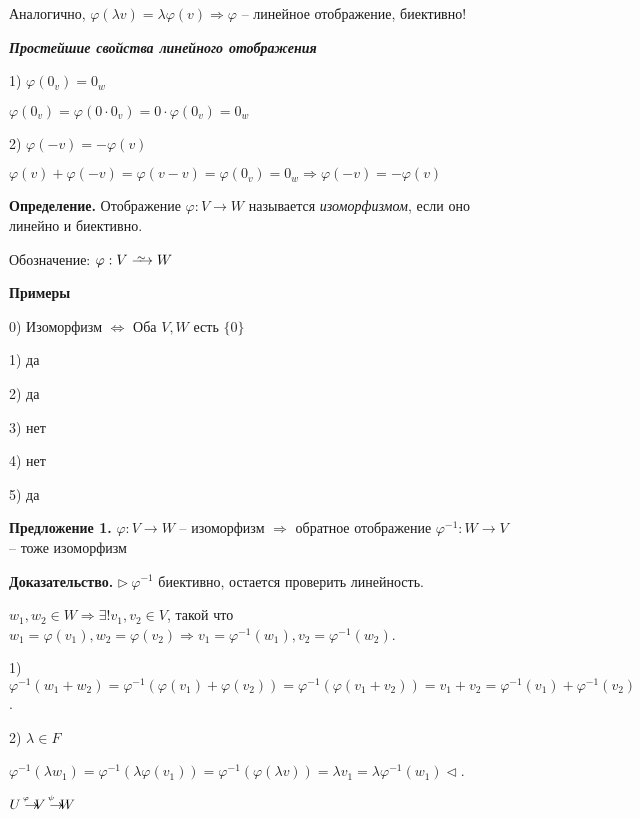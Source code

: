 Аналогично, $\varphi(\lambda v) = \lambda \varphi (v) \Rightarrow \varphi$ -- линейное отображение, биективно!

\vspace{\baselineskip}
\textbf{\textit{Простейшие свойства линейного отображения}}

1) $\varphi(0_v) = 0_w$

$\varphi(0_v) = \varphi(0 \cdot 0_v) = 0 \cdot \varphi(0_v) = 0_w$

2) $\varphi(-v) = -\varphi(v)$

$\varphi(v) + \varphi(-v) = \varphi(v - v) = \varphi(0_v) = 0_w \Rightarrow \varphi(-v) = -\varphi(v)$

\vspace{\baselineskip}
\textbf{Определение.} Отображение $\varphi: V \rightarrow W$ называется \textit{изоморфизмом}, если оно линейно и биективно.

Обозначение: $\varphi: V \iso W$

\vspace{\baselineskip}
\textbf{Примеры}

0) Изоморфизм $\Leftrightarrow$ Оба $V, W$ есть $\{0\}$

1) да

2) да

3) нет

4) нет

5) да

\vspace{\baselineskip}
\textbf{Предложение 1.} $\varphi: V \rightarrow W$ -- изоморфизм $\Rightarrow$ обратное отображение $\varphi^{-1}: W \rightarrow V$ -- тоже изоморфизм

\vspace{\baselineskip}
\textbf{Доказательство.} $\rhd \ \varphi^{-1}$ биективно, остается проверить линейность.

$w_1, w_2 \in W \Rightarrow \exists ! v_1, v_2 \in V$, такой что $w_1 = \varphi (v_1), w_2 = \varphi(v_2) \Rightarrow v_1 = \varphi^{-1} (w_1), v_2 = \varphi^{-1} (w_2)$.

1) $\varphi^{-1} (w_1 + w_2) = \varphi^{-1} (\varphi(v_1) + \varphi(v_2)) = \varphi^{-1}(\varphi(v_1 + v_2)) = v_1 + v_2 = \varphi^{-1} (v_1) + \varphi^{-1} (v_2)$.

2) $\lambda \in F$

$\varphi^{-1} (\lambda w_1) = \varphi^{-1}( \lambda \varphi(v_1)) = \varphi^{-1} (\varphi (\lambda v)) = \lambda v_1 = \lambda \varphi^{-1}(w_1) \lhd$.

\vspace{\baselineskip}
$U \rightarrow^{\hspace{-4mm}^{\varphi}} V \rightarrow^{\hspace{-4mm}^{\psi}} W$ 

